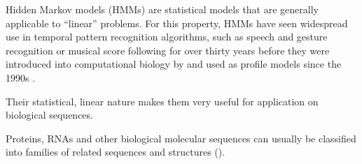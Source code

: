 \label{sec:hmms}
Hidden Markov models (HMMs) are statistical models that are generally applicable
to ``linear'' problems. For this property, HMMs have seen widespread use in
temporal pattern recognition algorithms, such as speech and gesture recognition
or musical score following for over thirty years before they were introduced
into computational biology by \citet{churchill1989} and used as profile models
since the 1990s \citep{krogh1994}.

Their statistical, linear nature makes them very useful for application on
biological sequences.



Proteins, RNAs and other biological molecular sequences can usually be
classified into families of related sequences and structures
(\cite{henikoff1997}).



